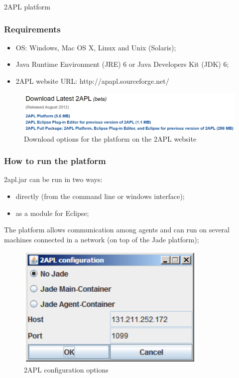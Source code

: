 	\begin{frame}
		\Huge{\centerline{2APL platform}}
	\end{frame}
	
	\begin{frame}
		\frametitle{Requirements}
		\begin{itemize}
			\item OS: Windows, Mac OS X, Linux and Unix (Solaris);
			\item Java Runtime Environment (JRE) 6 or Java Developers Kit (JDK) 6;
			\item 2APL website URL: http://apapl.sourceforge.net/
		\end{itemize}
		
		\begin{figure}
			\includegraphics[width=0.9\linewidth]{images/2APLdownload.png}
			\caption{Download options for the platform on the 2APL website}
		\end{figure}
	\end{frame}
	
	
	\begin{frame}
		\frametitle{How to run the platform}
		2apl.jar can be run in two ways:
		\begin{itemize}
			\item directly (from the command line or windows interface);
			\item as a module for Eclipse;
		\end{itemize}
		
		The platform allows communication among agents and can run on several machines connected in a network (on top of the Jade platform);
		
		\begin{figure}
			\includegraphics[width=0.4\linewidth]{images/2APLconf.png}
			\caption{2APL configuration options}
		\end{figure}
		
	\end{frame}
	
